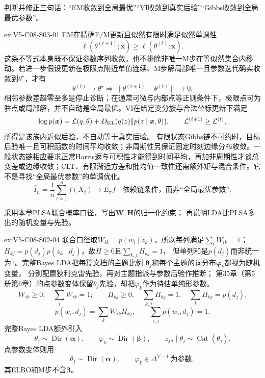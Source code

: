 \begin{SLChapterExercisePairSection}
\begin{exercise}\label{ex:V5-C08-S03-01}
判断并修正三句话：“EM收敛到全局最优”“VI收敛到真实后验”“Gibbs收敛到全局最优参数”。
\end{exercise}
\label{sol:V5-C08-S03-01}
\begin{chapterexercisesolution}{ex:V5-C08-S03-01}
EM在精确E/M更新且似然有限时满足似然单调性
\[
\ell(\theta^{(t+1)};\boldsymbol x)\ge\ell(\theta^{(t)};\boldsymbol x).
\]
这条不等式本身既不保证参数序列收敛，也不排除非唯一M步在等似然集合内移动。若进一步假设更新在极限点附近单值连续、M步解局部唯一且参数迭代确实收敛到$\theta^\star$，才有
\[
\theta^{(t)}\to\theta^\star
\Longrightarrow
\|\theta^{(t+1)}-\theta^{(t)}\|\to0.
\]
相邻参数差趋零至多是停止诊断；在通常可微与内部点等正则条件下，极限点可为驻点或局部解，并不自动是全局最优。VI在给定变分族与合法坐标更新下满足
\[
\log p(\boldsymbol x)
=\mathcal L(q,\theta)
+D_{\rm KL}(q(z)\|p(z\mid\boldsymbol x,\theta)),
\qquad
\mathcal L^{(t+1)}\ge\mathcal L^{(t)},
\]
所得是该族内近似后验，不自动等于真实后验。
有限状态Gibbs链不可约时，目标后验唯一且可积函数的时间平均收敛；非周期性另保证固定时刻边缘分布收敛。一般状态链相应要求正常Harris返与可积性才能得到时间平均，再加非周期性才谈总变差或边缘收敛；CLT、有限渐近方差和批均值一致性还需额外矩与混合条件。它不是寻找“全局最优参数”的单调优化。
\[
\widehat I_n=\frac1n\sum_{t=1}^nf(X_t)\longrightarrow E_\pi f
\quad\text{依赖链条件，而非“全局最优参数”}.
\]
\end{chapterexercisesolution}

\begin{exercise}\label{ex:V5-C08-S02-04}
采用本章PLSA联合概率口径，写出$\boldsymbol W,\boldsymbol H$的归一化约束；
再说明LDA比PLSA多出的随机变量与先验。
\end{exercise}
\label{sol:V5-C08-S02-04}
\begin{chapterexercisesolution}{ex:V5-C08-S02-04}
联合口径取$W_{ik}=p(w_i\mid z_k)$，所以每列满足$\sum_iW_{ik}=1$；
$H_{kj}=p(d_j)p(z_k\mid d_j)$，故$H\ge0$且$\sum_{k,j}H_{kj}=1$，
但单列和是$p(d_j)$而非统一为$1$。完整Bayes LDA把每篇文档的主题比例
$\boldsymbol\theta_j$和每个主题的词分布$\boldsymbol\varphi_k$都视为随机变量，
分别配置狄利克雷先验，再对主题指派与参数后验作推断；
第35章（第5册第6章）的点参数变体保留$\theta_j$先验，却把$\varphi_k$作为待估单纯形参数。
\[
W_{ik}\ge0,\quad \sum_iW_{ik}=1;\qquad
H_{kj}\ge0,\quad \sum_{k,j}H_{kj}=1,\quad
\sum_kH_{kj}=p(d_j).
\]
\[
p(w_i,d_j)=\sum_kW_{ik}H_{kj},\qquad
\sum_{i,j}p(w_i,d_j)=1.
\]
完整Bayes LDA额外引入
\[
\theta_j\sim\operatorname{Dir}(\boldsymbol\alpha),\qquad
\varphi_k\sim\operatorname{Dir}(\boldsymbol\beta),\qquad
z_{jn}\mid\theta_j\sim\operatorname{Cat}(\theta_j).
\]
点参数变体则用
\[
\theta_j\sim\operatorname{Dir}(\boldsymbol\alpha),\qquad
\varphi_k\in\Delta^{V-1}\ \text{为参数},
\]
其ELBO和M步不含$\boldsymbol\beta$。
\end{chapterexercisesolution}


\end{SLChapterExercisePairSection}
